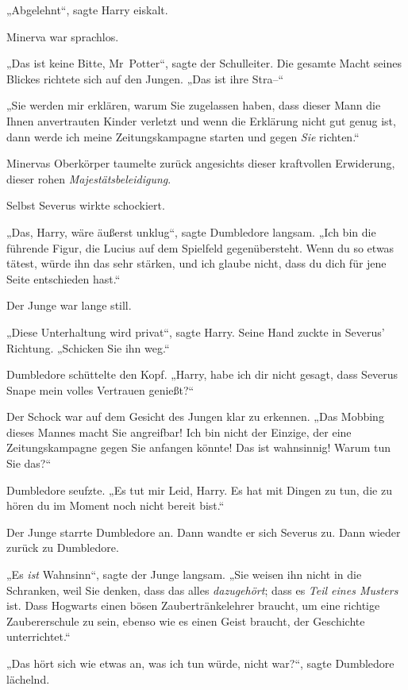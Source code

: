 „Abgelehnt“, sagte Harry eiskalt. 

Minerva war sprachlos. 

„Das ist keine Bitte, Mr~Potter“, sagte der Schulleiter. Die gesamte Macht seines Blickes richtete sich auf den Jungen. „Das ist ihre Stra–“ 

„Sie werden mir erklären, warum Sie zugelassen haben, dass dieser Mann die Ihnen anvertrauten Kinder verletzt und wenn die Erklärung nicht gut genug ist, dann werde ich meine Zeitungskampagne starten und gegen \emph{Sie} richten.“ 

Minervas Oberkörper taumelte zurück angesichts dieser kraftvollen Erwiderung, dieser rohen \emph{Majestätsbeleidigung}. 

Selbst Severus wirkte schockiert. 

„Das, Harry, wäre äußerst unklug“, sagte Dumbledore langsam. „Ich bin die führende Figur, die Lucius auf dem Spielfeld gegenübersteht. Wenn du so etwas tätest, würde ihn das sehr stärken, und ich glaube nicht, dass du dich für jene Seite entschieden hast.“ 

Der Junge war lange still. 

„Diese Unterhaltung wird privat“, sagte Harry. Seine Hand zuckte in Severus’ Richtung. „Schicken Sie ihn weg.“ 

Dumbledore schüttelte den Kopf. „Harry, habe ich dir nicht gesagt, dass Severus Snape mein volles Vertrauen genießt?“ 

Der Schock war auf dem Gesicht des Jungen klar zu erkennen. „Das Mobbing dieses Mannes macht Sie angreifbar! Ich bin nicht der Einzige, der eine Zeitungskampagne gegen Sie anfangen könnte! Das ist wahnsinnig! Warum tun Sie das?“ 

Dumbledore seufzte. „Es tut mir Leid, Harry. Es hat mit Dingen zu tun, die zu hören du im Moment noch nicht bereit bist.“ 

Der Junge starrte Dumbledore an. Dann wandte er sich Severus zu. Dann wieder zurück zu Dumbledore. 

„Es \emph{ist} Wahnsinn“, sagte der Junge langsam. „Sie weisen ihn nicht in die Schranken, weil Sie denken, dass das alles \emph{dazugehört}; dass es \emph{Teil eines Musters} ist. Dass Hogwarts einen bösen Zaubertränkelehrer braucht, um eine richtige Zaubererschule zu sein, ebenso wie es einen Geist braucht, der Geschichte unterrichtet.“ 

„Das hört sich wie etwas an, was ich tun würde, nicht war?“, sagte Dumbledore lächelnd. 


